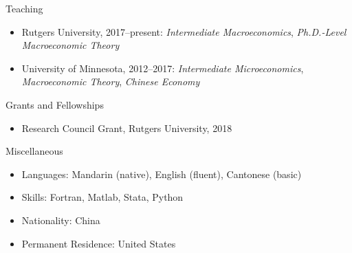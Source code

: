 \documentclass{resume} %
\begin{document}
\begin{rSection}{Teaching}
	\begin{itemize}
		\item[--] Rutgers University, 2017--present: \emph{Intermediate Macroeconomics}, \emph{Ph.D.-Level Macroeconomic Theory}
		\item[--] University of Minnesota, 2012--2017: \emph{Intermediate Microeconomics}, \emph{Macroeconomic Theory}, \emph{Chinese Economy}
	\end{itemize}
\end{rSection}

\begin{rSection}{Grants and Fellowships}
	\begin{itemize}
		\item[--] Research Council Grant, Rutgers University, 2018
	\end{itemize}
\end{rSection}


\begin{rSection}{Miscellaneous}
	\begin{itemize}
		\item[--] Languages: Mandarin (native), English (fluent), Cantonese (basic)
		\item[--] Skills: Fortran, Matlab, Stata, Python
		\item[--] Nationality: China
		\item[--] Permanent Residence: United States
	\end{itemize}
\end{rSection}
\end{document}
